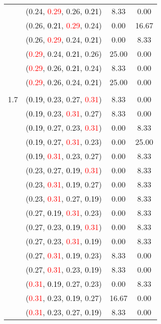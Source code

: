 \documentclass[10pt,a4paper]{report}
\begin{document}
\begin{center}
\begin{longtable}{clcc}
			&(0.24, \textcolor{red}{0.29}, 0.26, \textcolor{black}{0.21})&8.33&0.00\\
			&(0.26, \textcolor{black}{0.21}, \textcolor{red}{0.29}, 0.24)&0.00&16.67\\
			&(0.26, \textcolor{red}{0.29}, 0.24, \textcolor{black}{0.21})&0.00&8.33\\
			&(\textcolor{red}{0.29}, 0.24, \textcolor{black}{0.21}, 0.26)&25.00&0.00\\
			&(\textcolor{red}{0.29}, 0.26, \textcolor{black}{0.21}, 0.24)&8.33&0.00\\
			&(\textcolor{red}{0.29}, 0.26, 0.24, \textcolor{black}{0.21})&25.00&0.00\\
		&&&\\
		1.7			&(\textcolor{black}{0.19}, 0.23, 0.27, \textcolor{red}{0.31})&8.33&0.00\\
			&(\textcolor{black}{0.19}, 0.23, \textcolor{red}{0.31}, 0.27)&8.33&0.00\\
			&(\textcolor{black}{0.19}, 0.27, 0.23, \textcolor{red}{0.31})&0.00&8.33\\
			&(\textcolor{black}{0.19}, 0.27, \textcolor{red}{0.31}, 0.23)&0.00&25.00\\
			&(\textcolor{black}{0.19}, \textcolor{red}{0.31}, 0.23, 0.27)&0.00&8.33\\
			&(0.23, 0.27, \textcolor{black}{0.19}, \textcolor{red}{0.31})&0.00&8.33\\
			&(0.23, \textcolor{red}{0.31}, \textcolor{black}{0.19}, 0.27)&0.00&8.33\\
			&(0.23, \textcolor{red}{0.31}, 0.27, \textcolor{black}{0.19})&0.00&8.33\\
			&(0.27, \textcolor{black}{0.19}, \textcolor{red}{0.31}, 0.23)&0.00&8.33\\
			&(0.27, 0.23, \textcolor{black}{0.19}, \textcolor{red}{0.31})&0.00&8.33\\
			&(0.27, 0.23, \textcolor{red}{0.31}, \textcolor{black}{0.19})&0.00&8.33\\
			&(0.27, \textcolor{red}{0.31}, \textcolor{black}{0.19}, 0.23)&8.33&0.00\\
			&(0.27, \textcolor{red}{0.31}, 0.23, \textcolor{black}{0.19})&8.33&0.00\\
			&(\textcolor{red}{0.31}, \textcolor{black}{0.19}, 0.27, 0.23)&0.00&8.33\\
			&(\textcolor{red}{0.31}, 0.23, \textcolor{black}{0.19}, 0.27)&16.67&0.00\\
			&(\textcolor{red}{0.31}, 0.23, 0.27, \textcolor{black}{0.19})&8.33&0.00\\

\end{longtable}
\end{center}
\end{document}
